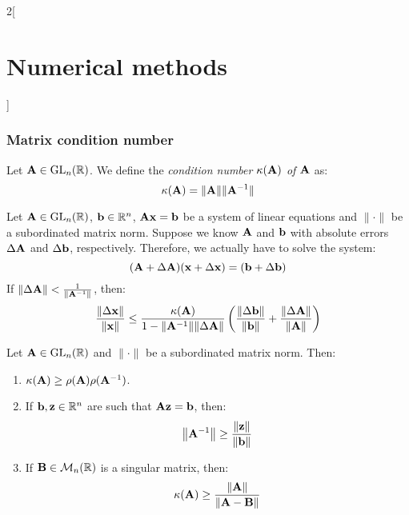 \documentclass[../../../main.tex]{subfiles}
\begin{document}
\begin{multicols}{2}[\section{Numerical methods}]
    \subsubsection*{Matrix condition number}
    \begin{definition}
        Let $\vb{A}\in\mathrm{GL}_n(\mathbb{R})$. We define the \textit{condition number $\kappa(\vb{A})$ of $\vb{A}$} as: $$\kappa(\vb{A})=\|\vb{A}\|\|\vb{A}^{-1}\|$$
    \end{definition}
    \begin{theorem}
        Let $\vb{A}\in\mathrm{GL}_n(\mathbb{R})$, $\vb{b}\in\mathbb{R}^n$, $\vb{A}\vb{x}=\vb{b}$ be a system of linear equations and $\|\cdot\|$ be a subordinated matrix norm. Suppose we know $\vb{A}$ and $\vb{b}$ with absolute errors $\Delta\vb{A}$ and $\Delta\vb{b}$, respectively. Therefore, we actually have to solve the system: $$(\vb{A}+\Delta\vb{A})(\vb{x}+\Delta \vb{x})=(\vb{b}+\Delta\vb{b})$$ If $\|\Delta\vb{A}\|<\frac{1}{\|\vb{A}^{-1}\|}$, then: $$\frac{\|\Delta \vb{x}\|}{\|\vb{x}\|}\leq\frac{\kappa(\vb{A})}{1-\norm{\vb{A}^{-1}}\norm{\Delta\vb{A}}}\left(\frac{\norm{\Delta\vb{b}}}{\norm{\vb{b}}}+\frac{\norm{\Delta\vb{A}}}{\norm{\vb{A}}}\right)$$
    \end{theorem}
    \begin{theorem}
        Let $\vb{A}\in\mathrm{GL}_n(\mathbb{R})$ and $\|\cdot\|$ be a subordinated matrix norm. Then:
        \begin{enumerate}
            \item $\kappa(\vb{A})\geq\rho(\vb{A})\rho(\vb{A}^{-1})$.
            \item If $\vb{b},\vb{z}\in\mathbb{R}^n$ are such that $\vb{A}\vb{z}=\vb{b}$, then: $$\norm{\vb{A}^{-1}}\geq\frac{\norm{\vb{z}}}{\norm{\vb{b}}}$$
            \item If $\vb{B}\in\mathcal{M}_n(\mathbb{R})$ is a singular matrix, then: $$\kappa(\vb{A})\geq\frac{\norm{\vb{A}}}{\norm{\vb{A}-\vb{B}}}$$
        \end{enumerate}
    \end{theorem}

\end{multicols}
\end{document}

